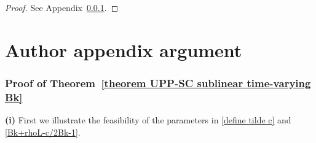 \documentclass[10pt,a4paper]{amsart}
\begin{document}
\begin{proof}
    See Appendix~\ref{proof theorem UPP-SC sublinear time-varying Bk}.
\end{proof}


\section*{Author appendix argument}

\subsubsection{Proof of Theorem~\ref{theorem UPP-SC sublinear time-varying Bk}}\label{proof theorem UPP-SC sublinear time-varying Bk}

\textbf{(i)} First we illustrate the feasibility of the parameters in \eqref{define tilde c} and \eqref{Bk+rhoL-c/2Bk-1}. 


\end{document}
